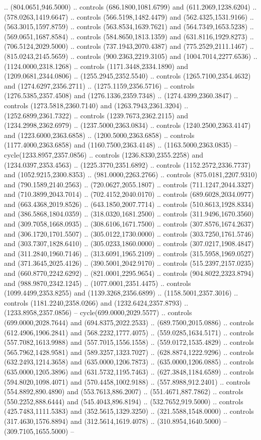 .. (804.0651,946.5000) .. controls (686.1800,1081.6799) and (611.2069,1238.6204) .. (578.0263,1419.6647) .. controls (566.5198,1482.4479) and (562.4325,1531.9166) .. (563.3015,1597.8759) .. controls (563.8534,1639.7621) and (564.7349,1653.5238) .. (569.0651,1687.8584) .. controls (584.8650,1813.1359) and (631.8116,1929.8273) .. (706.5124,2029.5000) .. controls (737.1943,2070.4387) and (775.2529,2111.1467) .. (815.0243,2145.5659) .. controls (900.2363,2219.3105) and (1004.7014,2277.6536) .. (1124.0000,2318.1268) .. controls (1171.3448,2334.1890) and (1209.0681,2344.0806) .. (1255.2945,2352.5540) .. controls (1265.7100,2354.4632) and (1274.6297,2356.2711) .. (1275.1159,2356.5716) .. controls (1276.5385,2357.4508) and (1276.1336,2359.7348) .. (1274.4399,2360.3847) .. controls (1273.5818,2360.7140) and (1263.7943,2361.3204) .. (1252.6899,2361.7322) .. controls (1239.7673,2362.2115) and (1234.2998,2362.6979) .. (1237.5000,2363.0834) .. controls (1240.2500,2363.4147) and (1223.6000,2363.6858) .. (1200.5000,2363.6858) .. controls (1177.4000,2363.6858) and (1160.7500,2363.4148) .. (1163.5000,2363.0835) -- cycle(1233.8957,2357.0856) .. controls (1236.8330,2355.2258) and (1234.0397,2353.4563) .. (1225.3770,2351.6892) .. controls (1152.2572,2336.7737) and (1052.9215,2300.8353) .. (981.0000,2263.2766) .. controls (875.0181,2207.9310) and (790.1589,2140.2563) .. (720.0627,2055.1807) .. controls (711.1247,2044.3327) and (710.3899,2043.7014) .. (702.4152,2040.0170) .. controls (689.6028,2034.0977) and (663.4368,2019.8526) .. (643.1850,2007.7714) .. controls (510.8613,1928.8334) and (386.5868,1804.0359) .. (318.0320,1681.2500) .. controls (311.9496,1670.3560) and (309.7058,1668.0935) .. (308.6106,1671.7500) .. controls (307.8576,1674.2637) and (306.1720,1701.5507) .. (305.0122,1730.0000) .. controls (303.7250,1761.5746) and (303.7307,1828.6410) .. (305.0233,1860.0000) .. controls (307.0217,1908.4847) and (311.2840,1960.7146) .. (313.6091,1965.2109) .. controls (315.5958,1969.0527) and (371.3645,2025.4126) .. (390.5001,2042.9170) .. controls (515.2397,2157.0235) and (660.8770,2242.6292) .. (821.0001,2295.9654) .. controls (904.8022,2323.8794) and (988.9870,2342.1245) .. (1077.0001,2351.4475) .. controls (1099.4499,2353.8255) and (1139.3268,2356.6899) .. (1158.5001,2357.3016) .. controls (1181.2240,2358.0266) and (1232.6424,2357.8793) .. (1233.8958,2357.0856) -- cycle(699.0000,2029.5577) .. controls (699.0000,2028.7644) and (694.8375,2022.2533) .. (689.7500,2015.0886) .. controls (612.4906,1906.2841) and (568.2232,1777.4075) .. (559.0285,1634.5171) .. controls (557.7082,1613.9988) and (557.7015,1556.1558) .. (559.0172,1535.4829) .. controls (565.7962,1428.9581) and (589.3257,1323.7027) .. (628.8874,1222.9296) .. controls (632.2493,1214.3658) and (635.0000,1206.7873) .. (635.0000,1206.0885) .. controls (635.0000,1205.3896) and (631.5732,1195.7463) .. (627.3848,1184.6589) .. controls (594.8020,1098.4071) and (570.4458,1002.9188) .. (557.8988,912.2401) .. controls (554.8892,890.4890) and (553.7613,886.2007) .. (551.4671,887.7862) .. controls (550.2252,888.6444) and (545.4043,896.8194) .. (532.7652,919.5000) .. controls (425.7483,1111.5383) and (352.5615,1329.3250) .. (321.5588,1548.0000) .. controls (317.4630,1576.8894) and (312.5614,1619.4078) .. (310.8954,1640.5000) -- (309.7105,1655.5000) -- 